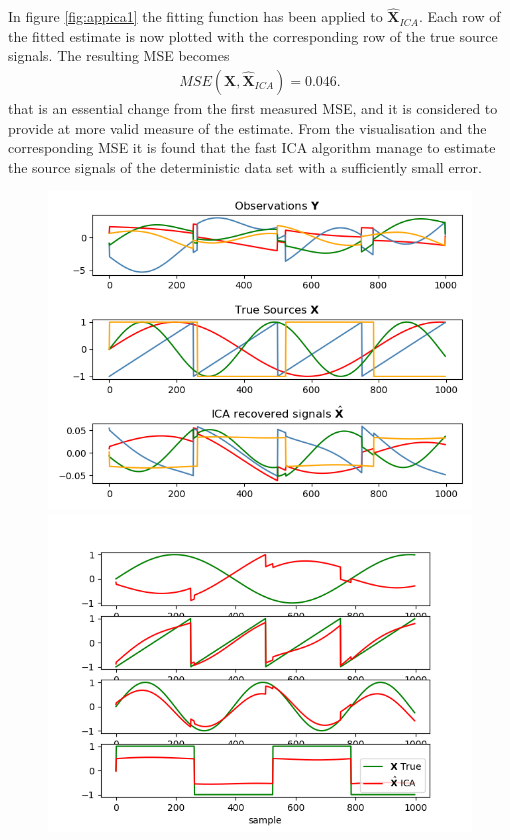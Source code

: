 In figure \ref{fig:appica1} the fitting function has been applied to $\hat{\textbf{X}}_{ICA}$. Each row of the fitted estimate is now plotted with the corresponding row of the true source signals. 
The resulting MSE becomes 
\begin{align*}
MSE(\textbf{X},\hat{\textbf{X}}_{ICA}) = 0.046.
\end{align*}  
that is an essential change from the first measured MSE, and it is considered to provide at more valid measure of the estimate. From the visualisation and the corresponding MSE it is found that the fast ICA algorithm manage to estimate the source signals of the deterministic data set with a sufficiently small error. 
\begin{figure}[H]
    \begin{minipage}[t]{.45\textwidth}
		\centering
		\includegraphics[scale=0.5]{figures/ICAapp/ICA_app1.png}
	\caption{}
	\label{fig:appica1}
    \end{minipage} 
    \hfill
    \begin{minipage}[t]{.45\textwidth}
		\centering
		\includegraphics[scale=0.5]{figures/ICAapp/ICA_app2.png}
	\caption{}
	\label{fig:appica2}
    \end{minipage}
\end{figure}

